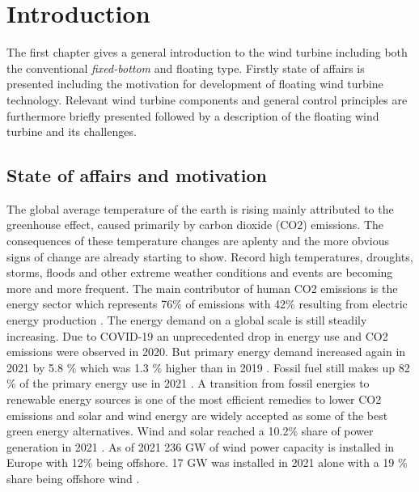 \section{Introduction} \label{sec:intro}
The first chapter gives a general introduction to the wind turbine including both the conventional \textit{fixed-bottom} and floating type. Firstly state of affairs is presented including the motivation for development of floating wind turbine technology. Relevant wind turbine components and general control principles are furthermore briefly presented followed by a description of the floating wind turbine and its challenges.


\subsection{State of affairs and motivation} \label{sec:intro_stateofaffairs}
The global average temperature of the earth is rising mainly attributed to the greenhouse effect, caused primarily by carbon dioxide (CO2) emissions. The consequences of these temperature changes are aplenty and the more obvious signs of change are already starting to show. Record high temperatures, droughts, storms, floods and other extreme weather conditions and events are becoming more and more frequent. The main contributor of human CO2 emissions is the energy sector which represents 76\% of emissions with 42\% resulting from electric energy production \cite{wri2018}. The energy demand on a global scale is still steadily increasing. Due to COVID-19 an unprecedented drop in energy use and CO2 emissions were observed in 2020. But primary energy demand increased again in 2021 by 5.8 \% which was 1.3 \% higher than in 2019 \cite{bp2022}. Fossil fuel still makes up 82 \% of the primary energy use in 2021 \cite{bp2022}. A transition from fossil energies to renewable energy sources is one of the most efficient remedies to lower CO2 emissions and solar and wind energy are widely accepted as some of the best green energy alternatives. Wind and solar reached a 10.2\% share of power generation in 2021 \cite{bp2022}. As of 2021 236 GW of wind power capacity is installed in Europe with 12\% being offshore. 17 GW was installed in 2021 alone with a 19 \% share being offshore wind \cite{Sesto1992}.

